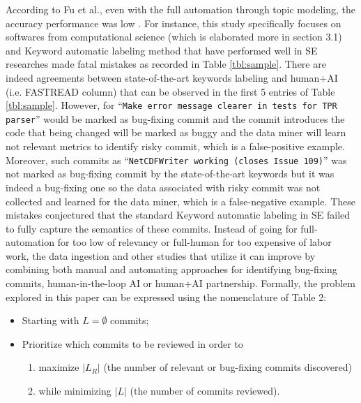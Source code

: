 \documentclass[sigconf,review, anonymous]{acmart}
\newcommand{\bi}{\begin{itemize}[leftmargin=0.4cm]}
\newcommand{\ei}{\end{itemize}}
\begin{document}
According to Fu et al., even with the full automation through topic modeling, the accuracy performance was low \cite{fu05committopic}. For instance, this study specifically focuses on softwares from computational science (which is elaborated more in section 3.1) and Keyword automatic labeling method that have performed well in SE researches \cite{commitguru, nayrolles18_clever, Kim08changes, kamei12_jit} made fatal mistakes as recorded in Table \ref{tbl:sample}. There are indeed agreements between state-of-the-art keywords labeling and human+AI (i.e. FASTREAD column) that can be observed in the first 5 entries of Table \ref{tbl:sample}. However, for ``\texttt{Make error message clearer in tests for TPR parser}'' would be marked as bug-fixing commit and the commit introduces the code that being changed will be marked as buggy and the data miner will learn not relevant metrics to identify risky commit, which is a false-positive example. Moreover, such commits as ``\texttt{NetCDFWriter working (closes Issue 109)}'' was not marked as bug-fixing commit by the state-of-the-art keywords but it was indeed a bug-fixing one so the data associated with risky commit was not collected and learned for the data miner, which is a false-negative example. These mistakes conjectured that the standard Keyword automatic labeling in SE failed to fully capture the semantics of these commits. Instead of going for full-automation for too low of relevancy or full-human for too expensive of labor work, the data ingestion and other studies \cite{costa17szz, Kim08changes, nayrolles18_clever, catolino17_jitmobile, kamei12_jit, kamei12_jit} that utilize it can improve by combining both manual and automating approaches for identifying bug-fixing commits, human-in-the-loop AI or human+AI partnership. Formally, the problem explored in this paper can be expressed using the nomenclature of Table 2:
\bi
\item Starting with $L = \emptyset$ commits;
\item Prioritize which commits to be reviewed in order to 
\begin{enumerate}
    \item maximize $|L_{R}|$ (the number of relevant or bug-fixing commits discovered)
    \item while minimizing $|L|$ (the number of commits reviewed).
\end{enumerate}
\ei
\end{document}
